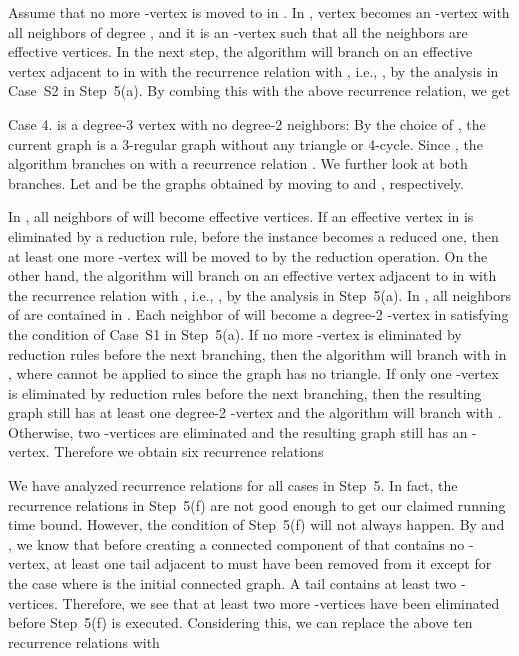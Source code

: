 \documentclass{elsart_TR2}
\begin{document}
Assume that no more -vertex is moved to  in .
In ,
vertex  becomes an -vertex with all neighbors of degree ,
and it is
an -vertex such that all the neighbors are effective vertices.
In the next step, the algorithm will branch on an effective vertex adjacent to  in 
 with the recurrence relation    with , i.e., ,
by the analysis in Case~S2 in Step~5(a).
By combing this with the above recurrence relation, we get


Case 4.  is a degree-3  vertex with no degree-2 neighbors:
By the choice of , the current graph   is a 3-regular graph without any triangle or 4-cycle.
Since ,   the algorithm  branches on  with a recurrence relation
 .
We further look at both branches.
Let  and  be the graphs obtained by moving  to  and , respectively.

In , all neighbors of  will become effective vertices.
If an effective vertex in  is  eliminated by a reduction rule, before the instance becomes a reduced one,
 then at least one more -vertex will be moved to  by the reduction operation.
On the other hand, the algorithm will branch on an effective vertex adjacent to  in 
with the recurrence relation
   with , i.e., , by the analysis in Step~5(a).
In ,  all neighbors of  are contained in .
Each neighbor  of  will become a degree-2 -vertex in  satisfying the condition of
Case~S1 in Step~5(a).
If no  more -vertex is eliminated by reduction rules before the next branching,
then the algorithm will branch
with  in , where  
cannot be applied to  since the graph has no triangle.
If only one -vertex is eliminated by reduction rules before
the next branching, then the resulting graph still has at least one degree-2 -vertex and the
algorithm will branch with .
Otherwise, two -vertices are eliminated and the resulting graph still has an -vertex.
Therefore we obtain six recurrence relations





We have analyzed recurrence relations for all cases in Step~5.
In fact, the  recurrence relations in Step~5(f)  are not good enough to get our claimed running time bound.
However, the condition of Step~5(f) will not always happen.
By  and , we know that before creating a connected component  of  that contains no -vertex,
at least one tail adjacent to  must have been removed from it
 except for the case where  is the initial connected graph.
A tail contains at least two -vertices.
Therefore, we see that
at least two more -vertices  have been eliminated before Step~5(f) is executed.
Considering this, we can replace the above ten recurrence relations with
  
     
   
\end{document}
